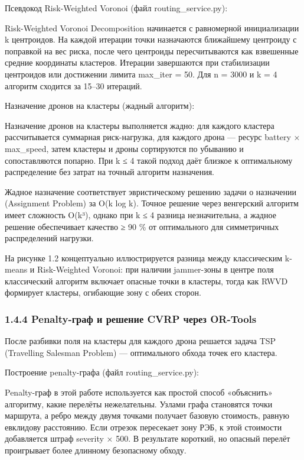 \documentclass[14pt,a4paper]{extarticle}
\begin{document}
Псевдокод Risk-Weighted Voronoi (файл routing\_service.py):

Risk-Weighted Voronoi Decomposition начинается с равномерной инициализации k центроидов. На каждой итерации точки назначаются ближайшему центроиду с поправкой на вес риска, после чего центроиды пересчитываются как взвешенные средние координаты кластеров. Итерации завершаются при стабилизации центроидов или достижении лимита max_iter = 50. Для n = 3000 и k = 4 алгоритм сходится за 15–30 итераций.


Назначение дронов на кластеры (жадный алгоритм):

Назначение дронов на кластеры выполняется жадно: для каждого кластера рассчитывается суммарная риск-нагрузка, для каждого дрона — ресурс battery × max_speed, затем кластеры и дроны сортируются по убыванию и сопоставляются попарно. При k ≤ 4 такой подход даёт близкое к оптимальному распределение без затрат на точный алгоритм назначения.


Жадное назначение соответствует эвристическому решению задачи о назначении (Assignment Problem) за O(k log k). Точное решение через венгерский алгоритм имеет сложность O(k³), однако при k ≤ 4 разница незначительна, а жадное решение обеспечивает качество ≥ 90 \% от оптимального для симметричных распределений нагрузки.

На рисунке 1.2 концептуально иллюстрируется разница между классическим k-means и Risk-Weighted Voronoi: при наличии jammer-зоны в центре поля классический алгоритм включает опасные точки в кластеры, тогда как RWVD формирует кластеры, огибающие зону с обеих сторон.

\hypertarget{penalty-ux433ux440ux430ux444-ux438-ux440ux435ux448ux435ux43dux438ux435-cvrp-ux447ux435ux440ux435ux437-or-tools}{%
\subsubsection{1.4.4 Penalty-граф и решение CVRP через OR-Tools}\label{penalty-ux433ux440ux430ux444-ux438-ux440ux435ux448ux435ux43dux438ux435-cvrp-ux447ux435ux440ux435ux437-or-tools}}

После разбивки поля на кластеры для каждого дрона решается задача TSP (Travelling Salesman Problem) --- оптимального обхода точек его кластера.

Построение penalty-графа (файл routing\_service.py):

Penalty-граф в этой работе используется как простой способ «объяснить» алгоритму, какие перелёты нежелательны. Узлами графа становятся точки маршрута, а ребро между двумя точками получает базовую стоимость, равную евклидову расстоянию. Если отрезок пересекает зону РЭБ, к этой стоимости добавляется штраф severity × 500. В результате короткий, но опасный перелёт проигрывает более длинному безопасному обходу.
\end{document}

